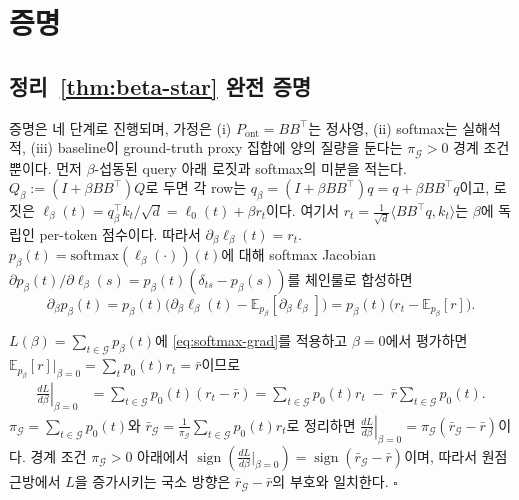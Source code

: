 \appendix
\section{증명}\label{app:proofs}

\subsection{정리~\ref{thm:beta-star} 완전 증명}\label{app:proof:beta-star}

증명은 네 단계로 진행되며, 가정은 (i) $P_{\mathrm{ont}} = BB^\top$는 정사영, (ii) softmax는 실해석적, (iii) baseline이 ground-truth proxy 집합에 양의 질량을 둔다는 $\pi_{\mathcal{G}} > 0$ 경계 조건뿐이다. 먼저 $\beta$-섭동된 query 아래 로짓과 softmax의 미분을 적는다. $Q_\beta := (I + \beta BB^\top) Q$로 두면 각 row는 $q_\beta = (I + \beta BB^\top) q = q + \beta BB^\top q$이고, 로짓은 $\ell_\beta(t) = q_\beta^\top k_t / \sqrt d = \ell_0(t) + \beta r_t$이다. 여기서 $r_t = \tfrac{1}{\sqrt d}\langle BB^\top q, k_t\rangle$는 $\beta$에 독립인 per-token 점수이다. 따라서 $\partial_\beta \ell_\beta(t) = r_t$. $p_\beta(t) = \mathrm{softmax}(\ell_\beta(\cdot))(t)$에 대해 softmax Jacobian $\partial p_\beta(t) / \partial \ell_\beta(s) = p_\beta(t)(\delta_{ts} - p_\beta(s))$를 체인룰로 합성하면
\begin{equation}\label{eq:softmax-grad}
\partial_\beta p_\beta(t) = p_\beta(t) \Big(\partial_\beta \ell_\beta(t) - \mathbb{E}_{p_\beta}[\partial_\beta \ell_\beta]\Big) = p_\beta(t) \big(r_t - \mathbb{E}_{p_\beta}[r]\big).
\end{equation}

$L(\beta) = \sum_{t\in\mathcal{G}} p_\beta(t)$에 \eqref{eq:softmax-grad}를 적용하고 $\beta=0$에서 평가하면 $\mathbb{E}_{p_\beta}[r]\big|_{\beta=0} = \sum_t p_0(t) r_t = \bar r$이므로
\begin{align*}
\left.\frac{dL}{d\beta}\right|_{\beta=0}
&= \sum_{t\in\mathcal{G}} p_0(t)(r_t - \bar r)
 = \sum_{t\in\mathcal{G}} p_0(t) r_t \;-\; \bar r \sum_{t\in\mathcal{G}} p_0(t).
\end{align*}
$\pi_{\mathcal{G}} = \sum_{t\in\mathcal{G}} p_0(t)$와 $\bar r_{\mathcal{G}} = \frac{1}{\pi_{\mathcal{G}}} \sum_{t\in\mathcal{G}} p_0(t) r_t$로 정리하면 $\left.\frac{dL}{d\beta}\right|_{\beta=0} = \pi_{\mathcal{G}}(\bar r_{\mathcal{G}} - \bar r)$이다. 경계 조건 $\pi_{\mathcal{G}} > 0$ 아래에서 $\operatorname{sign}\!\left(\frac{dL}{d\beta}\big|_{\beta=0}\right) = \operatorname{sign}(\bar r_{\mathcal{G}} - \bar r)$이며, 따라서 원점 근방에서 $L$을 증가시키는 국소 방향은 $\bar r_{\mathcal{G}} - \bar r$의 부호와 일치한다. $\square$


